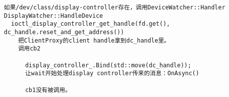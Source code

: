 \begin{verbatim}
如果/dev/class/display-controller存在，调用DeviceWatcher::Handler
DisplayWatcher::HandleDevice
  ioctl_display_controller_get_handle(fd.get(), dc_handle.reset_and_get_address())
    把ClientProxy的client handle拿到dc_handle里。
    调用cb2

      display_controller_.Bind(std::move(dc_handle));
      让wait开始处理display controller传来的消息：OnAsync()

      cb1没有被调用。


\end{verbatim}